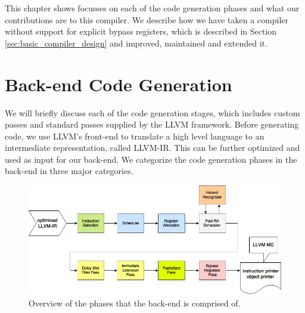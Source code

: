 

This chapter shows focusses on each of the code generation phases and what our contributions are to this compiler. We describe how we have taken a compiler without support for explicit bypass registers, which is described in Section \ref{sec:basic_compiler_design} and improved, maintained and extended it. 



\section{Back-end Code Generation}\label{sec:code_generation}
We will briefly discuss each of the code generation stages, which includes custom passes and standard passes supplied by the LLVM framework. Before generating code, we use LLVM's front-end to translate a high level language to an intermediate representation, called LLVM-IR. This can be further optimized and used as input for our back-end. We categorize the code generation phases in the back-end in three major categories.

\begin{figure}[H]
\centering
\hspace*{-.12in}
\includegraphics[scale=0.53]{figures/code_generation}
\caption{Overview of the phases that the back-end is comprised of.}
\label{fig:simd_backend}
\end{figure}


